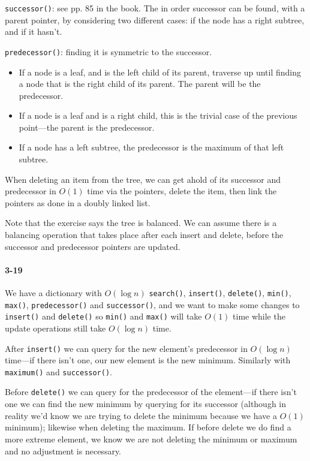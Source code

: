 \documentclass{report}
\begin{document}

\lstinline!successor()!: see pp. 85 in the book. The in order successor can be found, with
a parent pointer, by considering two different cases: if the node has a right subtree, and
if it hasn't.

\lstinline!predecessor()!: finding it is symmetric to the successor.
\begin{itemize}
	\item If a node is a leaf, and is the left child of its parent, traverse up until 
		finding a node that is the right child of its parent. The parent will be the 
		predecessor.
	\item If a node is a leaf and is a right child, this is the trivial case of the
		previous point---the parent is the predecessor.
	\item If a node has a left subtree, the predecessor is the maximum of that left
		subtree.
\end{itemize}

When deleting an item from the tree, we can get ahold of its successor and predecessor
in $O(1)$ time via the pointers, delete the item, then link the pointers as done in a
doubly linked list.

Note that the exercise says the tree is balanced. We can assume there is a balancing
operation that takes place after each insert and delete, before the successor and
predecessor pointers are updated.

\paragraph{3-19} We have a dictionary with $O(\log n)$ \lstinline!search()!,
\lstinline!insert()!, \lstinline!delete()!, \lstinline!min()!, \lstinline!max()!,
\lstinline!predecessor()! and \lstinline!successor()!, and we want to make some changes
to \lstinline!insert()! and \lstinline!delete()! so \lstinline!min()! and \lstinline!max()!
will take $O(1)$ time while the update operations still take $O(\log n)$ time.

After \lstinline!insert()! we can query for the new element's predecessor in $O(\log n)$
time---if there isn't one, our new element is the new minimum. Similarly with
\lstinline!maximum()! and \lstinline!successor()!.

Before \lstinline!delete()! we can query for the predecessor of the element---if there
isn't one we can find the new minimum by querying for its successor (although in reality
we'd know we are trying to delete the minimum because we have a $O(1)$ minimum); likewise
when deleting the maximum. If before delete we do find a more extreme element, we know
we are not deleting the minimum or maximum and no adjustment is necessary.
\end{document}
